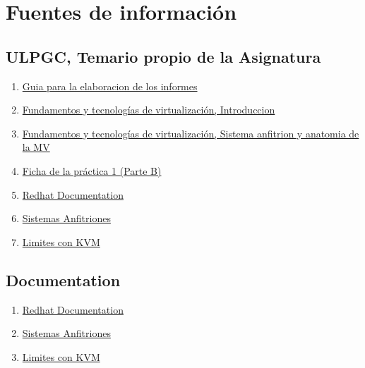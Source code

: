 \appendix
\chapter{Fuentes de información}

\section{ULPGC, Temario propio de la Asignatura}
\begin{enumerate}
    \item \href{https://aep2223.ulpgc.es/mod/resource/view.php?id=142919}{Guia para la elaboracion de los informes}
    \item \href{https://aep2223.ulpgc.es/mod/resource/view.php?id=142930}{Fundamentos y tecnologías de virtualización, Introduccion}
    \item \href{https://aep2223.ulpgc.es/mod/resource/view.php?id=142932}{Fundamentos y tecnologías de virtualización, Sistema anfitrion y anatomia de la MV}
    \item \href{https://aep2223.ulpgc.es/mod/resource/view.php?id=142970}{Ficha de la práctica 1 (Parte B)}
    \item \href{https://access.redhat.com/documentation/en-us/red_hat_enterprise_linux/7}{Redhat Documentation}
    \item \href{https://access.redhat.com/articles/rhel-limits}{Sistemas Anfitriones}
    \item \href{https://access.redhat.com/articles/rhel-kvm-limits}{Limites con KVM}
\end{enumerate}

\section{Documentation}
\begin{enumerate}
    \item \href{https://access.redhat.com/documentation/en-us/red_hat_enterprise_linux/7}{Redhat Documentation}
    \item \href{https://access.redhat.com/articles/rhel-limits}{Sistemas Anfitriones}
    \item \href{https://access.redhat.com/articles/rhel-kvm-limits}{Limites con KVM}
    
\end{enumerate}